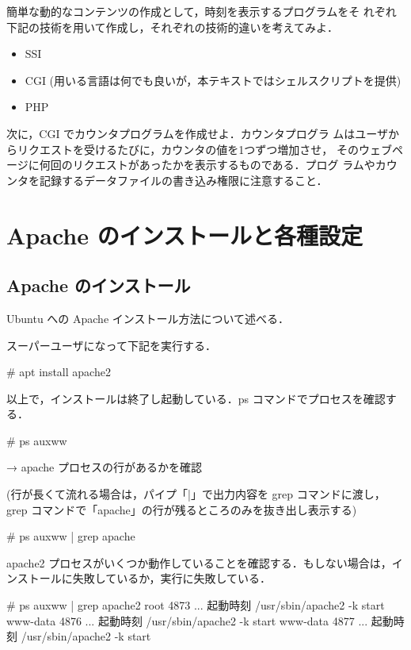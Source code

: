 簡単な動的なコンテンツの作成として，時刻を表示するプログラムをそ
れぞれ下記の技術を用いて作成し，それぞれの技術的違いを考えてみよ．
\begin{itemize}
 \item SSI
 \item CGI (用いる言語は何でも良いが，本テキストではシェルスクリプトを提供)
 \item PHP
\end{itemize}

次に，CGI でカウンタプログラムを作成せよ．カウンタプログラ
ムはユーザからリクエストを受けるたびに，カウンタの値を1つずつ増加させ，
そのウェブページに何回のリクエストがあったかを表示するものである．プログ
ラムやカウンタを記録するデータファイルの書き込み権限に注意すること．

\section{Apache のインストールと各種設定}

\subsection{Apache のインストール}

Ubuntu への Apache インストール方法について述べる．

スーパーユーザになって下記を実行する．
\begin{cli}
# apt install apache2
\end{cli}

以上で，インストールは終了し起動している．ps コマンドでプロセスを確認する．
\begin{cli}
# ps auxww

 → apache プロセスの行があるかを確認

(行が長くて流れる場合は，パイプ「|」で出力内容を grep コマンドに渡し，
grep コマンドで「apache」の行が残るところのみを抜き出し表示する)

# ps auxww | grep apache

\end{cli}

apache2 プロセスがいくつか動作していることを確認する．もしない場合は，インストールに失敗しているか，実行に失敗している．

\begin{cli}
# ps auxww | grep apache2
root      4873  ...  起動時刻 /usr/sbin/apache2 -k start
www-data  4876  ...  起動時刻 /usr/sbin/apache2 -k start
www-data  4877  ...  起動時刻 /usr/sbin/apache2 -k start
\end{cli}


